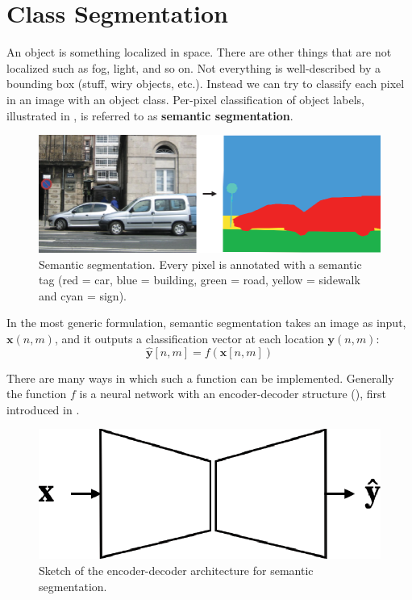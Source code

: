 \section{Class Segmentation}

An object is something localized in space. There are other things that are not localized such as fog, light, and so on. Not everything is well-described by a bounding box (stuff, wiry objects, etc.). Instead we can try to classify each pixel in an image with an object class. Per-pixel classification of object labels, illustrated in \fig{\ref{fig:semantic_class_segmentation}}, is referred to as {\bf semantic segmentation}.


\begin{figure}
\centerline{
\includegraphics[width=0.6\linewidth]{figures/object_recognition/semantic.eps}
}
\caption{Semantic segmentation. Every pixel is annotated with a semantic tag (red = car, blue = building, green = road, yellow = sidewalk and cyan = sign).}
\label{fig:semantic_class_segmentation}
\end{figure}

In the most generic formulation, semantic segmentation takes an image as input, $\mathbf{x}(n,m)$, and it outputs a classification vector at each location $\mathbf{y}(n,m)$:
\begin{equation}
\hat{\mathbf{y}} \left[n,m \right] = f(\mathbf{x} \left[n,m \right])
\end{equation}

 
 
There are many ways in which such a function can be implemented. Generally the function $f$ is a neural network with an encoder-decoder structure (\fig{\ref{fig:segmentation_architecture}}), first introduced in \cite{Badrinarayanan2015}. 

\begin{figure}
\centerline{
\includegraphics[width=0.3\linewidth]{figures/object_recognition/segmentation_architecture.eps}
}
\caption{Sketch of the encoder-decoder architecture for semantic segmentation.}
\label{fig:segmentation_architecture}
\end{figure}

